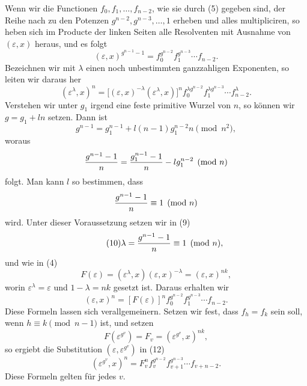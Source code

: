 \documentclass[11pt]{article}
\begin{document}
Wenn wir die Functionen $f_0,f_1,\ldots,f_{n-2}$, wie sie durch (5) gegeben sind, der Reihe nach zu den Potenzen $g^{n-2},g^{n-3},\ldots,1$ erheben und alles multipliciren, so heben sich im Producte der linken Seiten alle Resolventen mit Ausnahme von $(\varepsilon,x)$ heraus, und es folgt
\begin{equation}\tag{8}
  (\varepsilon,x)^{g^{n-1}-1}=f_0^{g^{n-2}}f_1^{g^{n-3}}\cdots f_{n-2}.
\end{equation}
Bezeichnen wir mit $\lambda$ einen noch unbestimmten ganzzahligen Exponenten, so leiten wir daraus her
\begin{equation}\tag{9}
  (\varepsilon^\lambda,x)^n=\big[(\varepsilon,x)^{-\lambda}(\varepsilon^\lambda,x)\big]^n
  f_0^{\lambda g^{n-2}}f_1^{\lambda g^{n-3}}\cdots f_{n-2}^{\lambda}.
\end{equation}
Verstehen wir unter $g_1$ irgend eine feste primitive Wurzel von $n$, so k\"onnen wir $g=g_1+ln$ setzen. Dann ist
\[
  g^{n-1}=g_1^{n-1}+l(n-1)g_1^{n-2}n \pmod {n^2},
\]
woraus
\[
  {g^{n-1}-1\over n}={g_1^{n-1}-1\over n}-l g_1^{n-2}\pmod n
\]
folgt. Man kann $l$ so bestimmen, dass
\[
  {g^{n-1}-1\over n}\equiv 1\pmod n
\]
wird. Unter dieser Voraussetzung setzen wir in (9)
\begin{equation}\tag{10}
  \lambda={g^{n-1}-1\over n}\equiv 1\pmod n,
\end{equation}
und wie in (4)
\begin{equation}\tag{11}
  F(\varepsilon)=(\varepsilon^\lambda,x)(\varepsilon,x)^{-\lambda}=(\varepsilon,x)^{nk},
\end{equation}
worin $\varepsilon^\lambda=\varepsilon$ und $1-\lambda=nk$ gesetzt ist. Daraus erhalten wir
\begin{equation}\tag{12}
  (\varepsilon,x)^n=[F(\varepsilon)]^n f_0^{g^{n-2}}f_1^{g^{n-3}}\cdots f_{n-2}.
\end{equation}
Diese Formeln lassen sich verallgemeinern. Setzen wir fest, dass $f_h=f_k$ sein soll, wenn $h\equiv k\pmod{n-1}$ ist, und setzen
\begin{equation}\tag{13}
  F(\varepsilon^{g^v})=F_v=(\varepsilon^{g^v},x)^{nk},
\end{equation}
so ergiebt die Substitution $(\varepsilon,\varepsilon^{g^v})$ in (12)
\begin{equation}\tag{14}
  (\varepsilon^{g^v},x)^n=F_v^n f_v^{g^{n-2}}f_{v+1}^{g^{n-3}}\cdots f_{v+n-2}.
\end{equation}
Diese Formeln gelten f\"ur jedes $v$.
\end{document}

